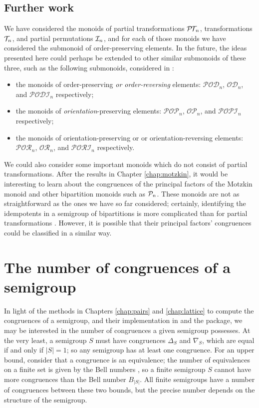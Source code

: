 \subsection{Further work}
\label{sec:princfact-further}
We have considered the monoids of partial transformations $\mathcal{P\!T\!}_n$,
transformations $\mathcal{T}_n$, and partial permutations $\mathcal{I}_n$, and for each of those
monoids we have considered the submonoid of order-preserving elements.  In the
future, the ideas presented here could perhaps be extended to other similar
submonoids of these three, such as the following submonoids, considered in
\cite[\S1.2]{wilf_ii}:

\begin{itemize}
\item the monoids of order-preserving \textit{or order-reversing} elements:
  $\mathcal{P\!O\!D\!}_n$, $\mathcal{O\!D\!}_n$, and $\mathcal{P\!O\!D\!I\!}_n$
  respectively;
\item the monoids of \textit{orientation}-preserving elements:
  $\mathcal{P\!O\!P\!}_n$, $\mathcal{O\!P\!}_n$, and $\mathcal{P\!O\!P\!I\!}_n$
  respectively;
\item the monoids of orientation-preserving or or orientation-reversing
  elements: $\mathcal{P\!O\!R\!}_n$, $\mathcal{O\!R\!}_n$, and
  $\mathcal{P\!O\!R\!I\!}_n$ respectively.
\end{itemize}

We could also consider some important monoids which do not consist of partial
transformations.  After the results in Chapter \ref{chap:motzkin}, it would be
interesting to learn about the congruences of the principal factors of the
Motzkin monoid and other bipartition monoids such as $\mathcal{P}_n$.  These monoids
are not as straightforward as the ones we have so far considered; certainly,
identifying the idempotents in a semigroup of bipartitions is more complicated
than for partial transformations \cite[Theorem 5]{pn_ids}.  However, it is
possible that their principal factors' congruences could be classified in a
similar way.



\section{The number of congruences of a semigroup}
\label{sec:nrcongs}

In light of the methods in Chapters \ref{chap:pairs} and \ref{chap:lattice} to
compute the congruences of a semigroup, and their implementation in
\libsemigroups{} and the \Semigroups{} package, we may be interested in the
number of congruences a given semigroup possesses.  At the very least, a
semigroup $S$ must have congruences $\Delta_S$ and $\nabla_S$, which are equal
if and only if $|S| = 1$; so any semigroup has at least one congruence.  For an
upper bound, consider that a congruence is an equivalence; the number of
equivalences on a finite set is given by the Bell numbers , so
a finite semigroup $S$ cannot have more congruences than the Bell number
$B_{|S|}$.  All finite semigroups have a number of congruences between these two
bounds, but the precise number depends on the structure of the semigroup.

